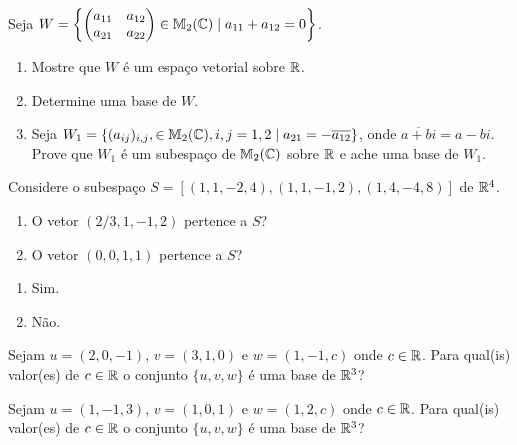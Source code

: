 \documentclass[12pt]{exam}
\begin{document}
\begin{exercicio}
	Seja $W = \left\{\begin{pmatrix} a_{11} & a_{12}\\ a_{21} & a_{22}\end{pmatrix} \in \mathbb{M}_2(\mathbb{C}) \mid a_{11} + a_{12} = 0\right\}$.
	\begin{enumerate}[label={\alph*})]
		\item Mostre que $W$ \'e um espa\c{c}o vetorial sobre $\mathbb{R}$.
		\item Determine uma base de $W$.
		\item Seja $W_1 = \{(a_{ij})_{i,j}, \in \mathbb{M}_2(\mathbb{C}), i, j = 1, 2 \mid a_{21} = -\overline{a_{12}}\}$, onde $\overline{a + bi} = a - bi$. Prove que $W_1$ \'e um subespa\c{c}o de $\mathbb{M}_2(\mathbb{C})$ sobre $\mathbb{R}$ e ache uma base de $W_1$.
	\end{enumerate}
\end{exercicio}

\begin{exercicio}
	Considere o subespa\c{c}o $S = [(1,1,-2,4),(1,1,-1,2),(1,4,-4,8)]$ de $\mathbb{R}^4$.
	\begin{enumerate}[label={\alph*})]
		\item O vetor $(2/3, 1, -1, 2)$ pertence a $S$?
		\item O vetor $(0, 0, 1, 1)$ pertence a $S$?
	\end{enumerate}
	\begin{solucao}
		\begin{enumerate}[label={\alph*})]
			\item Sim.
			\item N\~ao.
		\end{enumerate}
	\end{solucao}
\end{exercicio}

\begin{exercicio}
	Sejam $u = (2, 0 , -1)$, $v = (3, 1 , 0)$ e $w = (1, -1 , c)$ onde $c \in \mathbb{R}$. Para qual(is) valor(es) de $c \in \mathbb{R}$ o conjunto $\{u, v, w\}$ \'e uma base de $\mathbb{R}^3$?
\end{exercicio}

\begin{exercicio}
	Sejam $u = (1, -1 , 3)$, $v = (1, 0 , 1)$ e $w = (1, 2 , c)$ onde $c \in \mathbb{R}$. Para qual(is) valor(es) de $c \in \mathbb{R}$ o conjunto $\{u, v, w\}$ \'e uma base de $\mathbb{R}^3$?
\end{exercicio}
\end{document}
